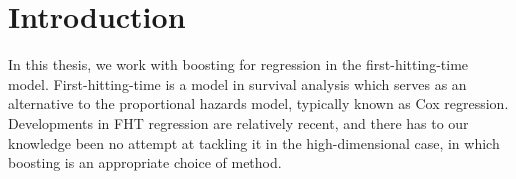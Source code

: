 \chapter{Introduction}
\label{sec:intro}

In this thesis, we work with boosting for regression in the first-hitting-time model. First-hitting-time is a model in survival analysis which serves as an alternative to the proportional hazards model, typically known as Cox regression. Developments in FHT regression are relatively recent, and there has to our knowledge been no attempt at tackling it in the high-dimensional case, in which boosting is an appropriate choice of method.